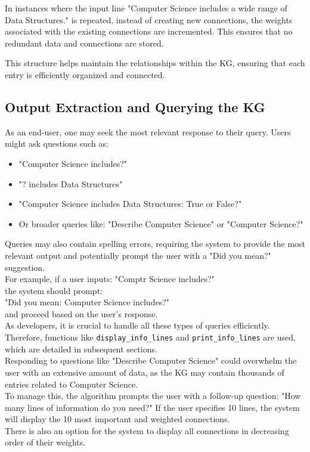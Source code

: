 \documentclass[conference]{IEEEtran}
\begin{document}
In instances where the input line "Computer Science includes a wide range of Data Structures." is 
repeated, instead of creating new connections, the weights associated with the existing connections 
are incremented. This ensures that no redundant data and connections are stored.

This structure helps maintain the relationships within the KG, 
ensuring that each entry is efficiently organized and connected.


\subsection{Output Extraction and Querying the KG}

As an end-user, one may seek the most relevant response to their query. Users might ask questions such as:
\begin{itemize}
    \item "Computer Science includes?"
    \item "? includes Data Structures"
    \item "Computer Science includes Data Structures: True or False?"
    \item Or broader queries like: "Describe Computer Science" or "Computer Science?"
\end{itemize}

Queries may also contain spelling errors, requiring the system to provide the most relevant output and potentially prompt the user with a "Did you mean?" suggestion.
\\
For example, if a user inputs: "Comptr Science includes?" 
\\the system should prompt:
\\
"Did you mean: Computer Science includes?" 
\\
and proceed based on the user's response.
\\

As developers, it is crucial to handle all these types of queries efficiently. Therefore, functions like \texttt{display\_info\_lines} and \texttt{print\_info\_lines} are used, which are detailed in subsequent sections.
\\

Responding to questions like "Describe Computer Science" could overwhelm the user with an extensive amount of data, as the KG may contain thousands of entries related to Computer Science. \\
To manage this, the algorithm prompts the user with a follow-up question: "How many lines of information do you need?" If the user specifies 10 lines, the system will display the 10 most important and weighted connections. 
\\
There is also an option for the system to display all connections in decreasing order of their weights.
\end{document}
